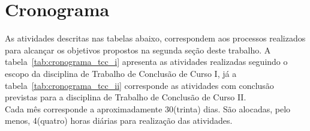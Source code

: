 \documentclass[font=plain]{abnt}
\begin{document}



\chapter{Cronograma}
As atividades descritas nas tabelas abaixo, correspondem aos processos realizados para alcançar os objetivos propostos na segunda seção deste trabalho.
A tabela~\ref{tab:cronograma_tcc_i} apresenta as atividades realizadas seguindo o escopo da disciplina de Trabalho de Conclusão de Curso I, já a tabela~\ref{tab:cronograma_tcc_ii} corresponde as atividades com conclusão previstas para a disciplina de Trabalho de Conclusão de Curso II.\space\\
Cada mês corresponde a aproximadamente 30(trinta) dias. São alocadas, pelo menos, 4(quatro) horas diárias para realização das atividades.
\end{document}
